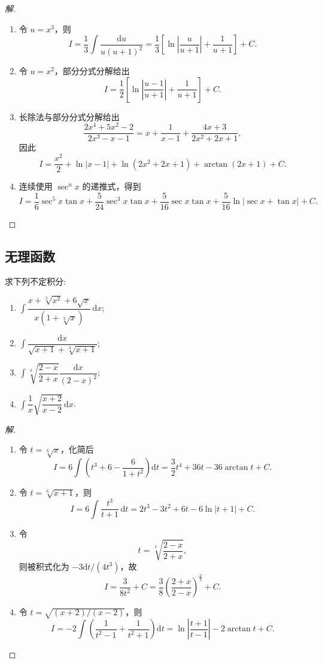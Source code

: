 \documentclass[../../数学分析培优讲义(答案版).tex]{subfiles}
\begin{document}
\begin{proof}[解]
\begin{enumerate}[label=(\arabic*)]
    \item 令 $u=x^3$，则
    \[
        I=\dfrac{1}{3}\int\dfrac{\mathrm{d}u}{u(u+1)^2}
        =\dfrac{1}{3}\left[\ln\left|\dfrac{u}{u+1}\right|+\dfrac{1}{u+1}\right]+C.
    \]
    \item 令 $u=x^2$，部分分式分解给出
    \[
        I=\dfrac{1}{2}\left[\ln\left|\dfrac{u-1}{u+1}\right|+\dfrac{1}{u+1}\right]+C.
    \]
    \item 长除法与部分分式分解给出
    \[
        \dfrac{2x^4+5x^2-2}{2x^3-x-1}
        =x+\dfrac{1}{x-1}+\dfrac{4x+3}{2x^2+2x+1},
    \]
    因此
    \[
        I=\dfrac{x^2}{2}+\ln|x-1|+\ln(2x^2+2x+1)
        +\arctan(2x+1)+C.
    \]
    \item 连续使用 $\sec^n x$ 的递推式，得到
    \[
        I=\dfrac{1}{6}\sec^5x\tan x+\dfrac{5}{24}\sec^3x\tan x
        +\dfrac{5}{16}\sec x\tan x
        +\dfrac{5}{16}\ln|\sec x+\tan x|+C.
    \]
\end{enumerate}
\end{proof}

\subsection{无理函数}

\begin{example}
求下列不定积分:
\begin{enumerate}[label=(\arabic*)]
    \item $\displaystyle\int\dfrac{x+\sqrt[3]{x^2}+6\sqrt{x}}{x(1+\sqrt[3]{x})}\,\mathrm{d}x$;
    \item $\displaystyle\int\dfrac{\mathrm{d}x}{\sqrt{x+1}+\sqrt[3]{x+1}}$;
    \item $\displaystyle\int\sqrt[3]{\dfrac{2-x}{2+x}}\dfrac{\mathrm{d}x}{(2-x)^2}$;
    \item $\displaystyle\int\dfrac{1}{x}\sqrt{\dfrac{x+2}{x-2}}\,\mathrm{d}x$.
\end{enumerate}
\end{example}

\begin{proof}[解]
\begin{enumerate}[label=(\arabic*)]
    \item 令 $t=\sqrt[6]{x}$，化简后
    \[
        I=6\int\left(t^3+6-\dfrac{6}{1+t^2}\right)\mathrm{d}t
        =\dfrac{3}{2}t^4+36t-36\arctan t+C.
    \]
    \item 令 $t=\sqrt[6]{x+1}$，则
    \[
        I=6\int\dfrac{t^3}{t+1}\,\mathrm{d}t
        =2t^3-3t^2+6t-6\ln|t+1|+C.
    \]
    \item 令
    \[
        t=\sqrt[3]{\dfrac{2-x}{2+x}},
    \]
    则被积式化为 $-3\mathrm{d}t/(4t^3)$，故
    \[
        I=\dfrac{3}{8t^2}+C
        =\dfrac{3}{8}\left(\dfrac{2+x}{2-x}\right)^{\frac{2}{3}}+C.
    \]
    \item 令 $t=\sqrt{(x+2)/(x-2)}$，则
    \[
        I=-2\int\left(\dfrac{1}{t^2-1}+\dfrac{1}{t^2+1}\right)\mathrm{d}t
        =\ln\left|\dfrac{t+1}{t-1}\right|-2\arctan t+C.
    \]
\end{enumerate}
\end{proof}
\end{document}
